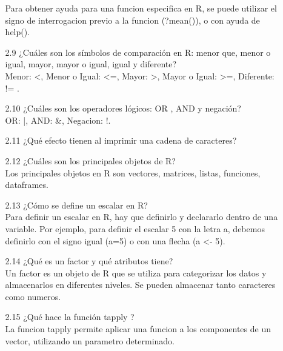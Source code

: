 \documentclass[letterpaper, 12pt]{article}
\begin{document}
\begin{enumerate}
\begin{enumerate}
Para obtener ayuda para una funcion especifica en R, se puede utilizar el signo
de interrogacion previo a la funcion (?mean()), o con ayuda de help().
\item[2.9] ¿Cuáles son los símbolos de comparación en R: menor que, menor o 
igual, mayor, mayor o igual, igual y diferente?\\
Menor: <, Menor o Igual: <=, Mayor: >, Mayor o Igual: >=, Diferente: != . 
\item[2.10] ¿Cuáles son los operadores lógicos: OR , AND y negación?\\
OR: |, AND: \&, Negacion: !.
\item[2.11] ¿Qué efecto tienen  al imprimir una cadena de caracteres?
\item[2.12] ¿Cuáles son los principales objetos de R?\\
Los principales objetos en R son vectores, matrices, listas, funciones, 
dataframes.
\item[2.13] ¿Cómo se define un escalar en R?\\
Para definir un escalar en R, hay que definirlo y declararlo dentro de una 
variable. Por ejemplo, para definir el escalar 5 con la letra a, debemos 
definirlo con el signo igual (a=5) o con una flecha (a <- 5).
\item[2.14] ¿Qué es un factor y qué atributos tiene?\\
Un factor es un objeto de R que se utiliza para categorizar los datos y 
almacenarlos en diferentes niveles. Se pueden almacenar tanto caracteres como 
numeros.
\item[2.15] ¿Qué hace la función tapply ?\\
La funcion tapply permite aplicar una funcion a los componentes de un vector, 
utilizando un parametro determinado. 
\end{enumerate}


\end{enumerate}
\end{document}
